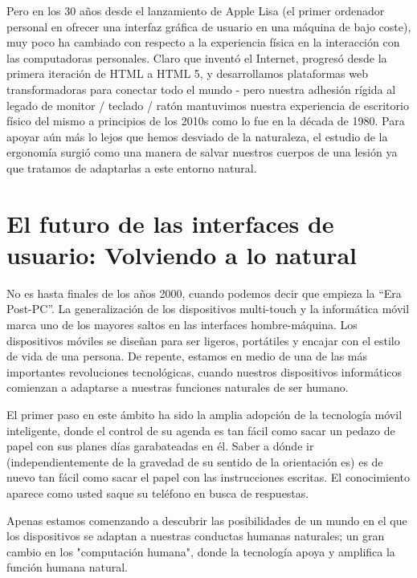 Pero en los 30 años desde el lanzamiento de Apple Lisa (el primer ordenador personal en ofrecer una interfaz gráfica de usuario en una máquina de bajo coste), muy poco ha cambiado con respecto a la experiencia física en la interacción con las computadoras personales. Claro que inventó el Internet, progresó desde la primera iteración de HTML a HTML 5, y desarrollamos plataformas web transformadoras para conectar todo el mundo - pero nuestra adhesión rígida al legado de monitor / teclado / ratón mantuvimos nuestra experiencia de escritorio físico del mismo a principios de los 2010s como lo fue en la década de 1980. Para apoyar aún más lo lejos que hemos desviado de la naturaleza, el estudio de la ergonomía surgió como una manera de salvar nuestros cuerpos de una lesión ya que tratamos de adaptarlas a este entorno natural.

\section{El futuro de las interfaces de usuario: Volviendo a lo natural}

No es hasta finales de los años 2000, cuando podemos decir que empieza la ``Era Post-PC''. La generalización de los dispositivos multi-touch y la informática móvil marca uno de los mayores saltos en las interfaces hombre-máquina. Los dispositivos móviles se diseñan para ser ligeros, portátiles y encajar con el estilo de vida de una persona. De repente, estamos en medio de una de las más importantes revoluciones tecnológicas, cuando nuestros dispositivos informáticos comienzan a adaptarse a nuestras funciones naturales de ser humano.

El primer paso en este ámbito ha sido la amplia adopción de la tecnología móvil inteligente, donde el control de su agenda es tan fácil como sacar un pedazo de papel con sus planes días garabateadas en él. Saber a dónde ir (independientemente de la gravedad de su sentido de la orientación es) es de nuevo tan fácil como sacar el papel con las instrucciones escritas. El conocimiento aparece como usted saque su teléfono en busca de respuestas.

Apenas estamos comenzando a descubrir las posibilidades de un mundo en el que los dispositivos se adaptan a nuestras conductas humanas naturales; un gran cambio en los "computación humana", donde la tecnología apoya y amplifica la función humana natural.

